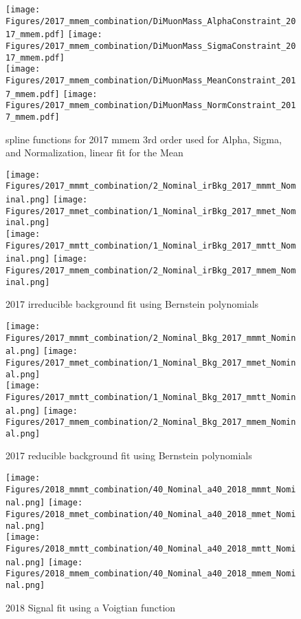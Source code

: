 \begin{figure}[ht!b]
    \centering 
    \texttt{[image: Figures/2017\_mmem\_combination/DiMuonMass\_AlphaConstraint\_2017\_mmem.pdf]}
    \texttt{[image: Figures/2017\_mmem\_combination/DiMuonMass\_SigmaConstraint\_2017\_mmem.pdf]}\\
    \texttt{[image: Figures/2017\_mmem\_combination/DiMuonMass\_MeanConstraint\_2017\_mmem.pdf]}
    \texttt{[image: Figures/2017\_mmem\_combination/DiMuonMass\_NormConstraint\_2017\_mmem.pdf]}\\
    \caption{\label{fig:spline_2017_mmem} spline functions for 2017 mmem 3rd order used for Alpha, Sigma, and Normalization, linear fit for the Mean}
\end{figure}

\begin{figure}[ht!b]
  \centering
  \texttt{[image: Figures/2017\_mmmt\_combination/2\_Nominal\_irBkg\_2017\_mmmt\_Nominal.png]}
  \texttt{[image: Figures/2017\_mmet\_combination/1\_Nominal\_irBkg\_2017\_mmet\_Nominal.png]}\\
  \texttt{[image: Figures/2017\_mmtt\_combination/1\_Nominal\_irBkg\_2017\_mmtt\_Nominal.png]}
  \texttt{[image: Figures/2017\_mmem\_combination/2\_Nominal\_irBkg\_2017\_mmem\_Nominal.png]}\\
    \caption{\label{fig:2017_fit_ZZ} 2017 irreducible background fit using Bernstein polynomials}
\end{figure}
\begin{figure}[ht!b]
  \centering
  \texttt{[image: Figures/2017\_mmmt\_combination/2\_Nominal\_Bkg\_2017\_mmmt\_Nominal.png]}
  \texttt{[image: Figures/2017\_mmet\_combination/1\_Nominal\_Bkg\_2017\_mmet\_Nominal.png]}\\
  \texttt{[image: Figures/2017\_mmtt\_combination/1\_Nominal\_Bkg\_2017\_mmtt\_Nominal.png]}
  \texttt{[image: Figures/2017\_mmem\_combination/2\_Nominal\_Bkg\_2017\_mmem\_Nominal.png]}\\
    \caption{\label{fig:2017_fit_FF} 2017 reducible background fit using Bernstein polynomials}
\end{figure}

\begin{figure}[ht!b]
  \centering
  \texttt{[image: Figures/2018\_mmmt\_combination/40\_Nominal\_a40\_2018\_mmmt\_Nominal.png]}
  \texttt{[image: Figures/2018\_mmet\_combination/40\_Nominal\_a40\_2018\_mmet\_Nominal.png]}\\
  \texttt{[image: Figures/2018\_mmtt\_combination/40\_Nominal\_a40\_2018\_mmtt\_Nominal.png]}
  \texttt{[image: Figures/2018\_mmem\_combination/40\_Nominal\_a40\_2018\_mmem\_Nominal.png]}\\
    \caption{\label{fig:2018_fit_sig} 2018 Signal fit using a Voigtian function}
\end{figure}

